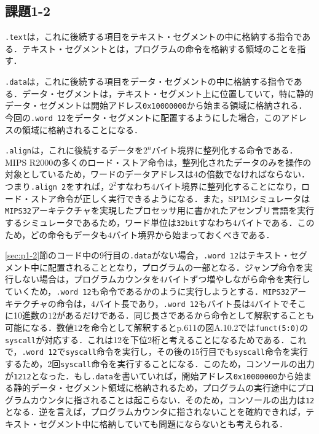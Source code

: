 \subsection{課題1-2}
\verb|.text|は，これに後続する項目をテキスト・セグメントの中に格納する指令である\cite{book:assembly}．テキスト・セグメントとは，プログラムの命令を格納する領域のことを指す．

\verb|.data|は，これに後続する項目をデータ・セグメントの中に格納する指令である\cite{book:assembly}．データ・セグメントは，テキスト・セグメント上に位置していて，特に静的データ・セグメントは開始アドレス\verb|0x10000000|から始まる領域に格納される．今回の\verb|.word 12|をデータ・セグメントに配置するようにした場合，このアドレスの領域に格納されることになる．

\verb|.align|は，これに後続するデータを$2^n$バイト境界に整列化する命令である\cite{book:assembly}．MIPS R2000の多くのロード・ストア命令は，整列化されたデータのみを操作の対象としているため，ワードのデータアドレスは4の倍数でなければならない．つまり\verb|.align 2|をすれば，$2^2$すなわち$4$バイト境界に整列化することになり，ロード・ストア命令が正しく実行できるようになる．また，SPIMシミュレータは\verb|MIPS32|アーキテクチャを実現したプロセッサ用に書かれたアセンブリ言語を実行するシミュレータであるため，ワード単位は\verb|32bit|すなわち$4$バイトである．このため，どの命令もデータも$4$バイト境界から始まっておくべきである．

\ref{sec:p1-2}節のコード中の9行目の\verb|.data|がない場合，\verb|.word 12|はテキスト・セグメント中に配置されることとなり，プログラムの一部となる．ジャンプ命令を実行しない場合は，プログラムカウンタを$4$バイトずつ増やしながら命令を実行していくため，\verb|.word 12|も命令であるかのように実行しようとする．\verb|MIPS32|アーキテクチャの命令は，$4$バイト長であり，\verb|.word 12|もバイト長は$4$バイトでそこに10進数の$12$があるだけである．同じ長さであるから命令として解釈することも可能になる．数値$12$を命令として解釈するとp.611の図A.10.2では\verb|funct(5:0)|の\verb|syscall|が対応する\cite{book:assembly}．これは12を下位2桁と考えることになるためである．これで，\verb|.word 12|で\verb|syscall|命令を実行し，その後の15行目でも\verb|syscall|命令を実行するため，2回\verb|syscall|命令を実行することになる．このため，コンソールの出力が\verb|1212|となった．もし\verb|.data|を書いていれば，開始アドレス\verb|0x10000000|から始まる静的データ・セグメント領域に格納されるため，プログラムの実行途中にプログラムカウンタに指されることは起こらない．そのため，コンソールの出力は\verb|12|となる．逆を言えば，プログラムカウンタに指されないことを確約できれば，テキスト・セグメント中に格納していても問題にならないとも考えられる．

